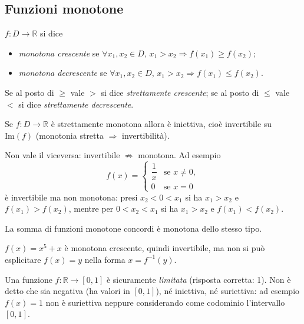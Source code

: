\documentclass[11pt,a4paper]{article}
\begin{document}
\subsection{Funzioni monotone}

\begin{definizione}
$f : D \to \mathbb{R}$ si dice
\begin{itemize}
    \item \emph{monotona crescente} se $\forall x_1, x_2 \in D$, $x_1 > x_2 \Rightarrow f(x_1) \geq f(x_2)$;
    \item \emph{monotona decrescente} se $\forall x_1, x_2 \in D$, $x_1 > x_2 \Rightarrow f(x_1) \leq f(x_2)$.
\end{itemize}
Se al posto di $\geq$ vale $>$ si dice \emph{strettamente crescente}; se al posto di $\leq$ vale $<$ si dice \emph{strettamente decrescente}.
\end{definizione}

\begin{proposizione}
Se $f : D \to \mathbb{R}$ è strettamente monotona allora è iniettiva, cioè invertibile su $\mathrm{Im}(f)$ (monotonia stretta $\Rightarrow$ invertibilità).
\end{proposizione}

Non vale il viceversa: invertibile $\not\Rightarrow$ monotona. Ad esempio
\[
f(x) = \begin{cases} \dfrac{1}{x} & \text{se } x \neq 0, \\[4pt] 0 & \text{se } x = 0 \end{cases}
\]
è invertibile ma non monotona: presi $x_2 < 0 < x_1$ si ha $x_1 > x_2$ e $f(x_1) > f(x_2)$, mentre per $0 < x_2 < x_1$ si ha $x_1 > x_2$ e $f(x_1) < f(x_2)$.

\begin{osservazione}
La somma di funzioni monotone concordi è monotona dello stesso tipo.
\end{osservazione}

\begin{esempio}
$f(x) = x^5 + x$ è monotona crescente, quindi invertibile, ma non si può esplicitare $f(x) = y$ nella forma $x = f^{-1}(y)$.
\end{esempio}

\begin{esempio}[Test]
Una funzione $f : \mathbb{R} \to [0,1]$ è sicuramente \emph{limitata} (risposta corretta: 1). Non è detto che sia negativa (ha valori in $[0,1]$), né iniettiva, né suriettiva: ad esempio $f(x) = 1$ non è suriettiva neppure considerando come codominio l'intervallo $[0,1]$.
\end{esempio}
\end{document}
